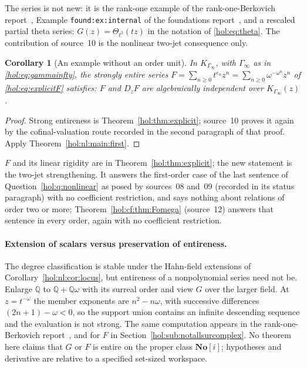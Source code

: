 \documentclass[11pt]{article}
\numberwithin{equation}{section}
\newtheorem{corollary}[theorem]{Corollary}
\theoremstyle{definition}
\theoremstyle{remark}
\newcommand{\Q}{\mathbb Q}
\newcommand{\No}{\mathbf{No}}
\begin{document}
The series is not new: it is the rank-one example of the
rank-one-Berkovich report~\cite{reporankone}, Example
\texttt{found:ex:internal} of the foundations report~\cite{repofoundations},
and a rescaled partial theta series: $G(z)=\Theta_{t^2}(tz)$ in the notation
of \eqref{hol:eq:theta}. The contribution of source~10 is the nonlinear two-jet
consequence only.

\begin{corollary}[An example without an order unit]
\label{hol:nl:cor:infiniterank}
In $K_{\Gamma_\infty}$, with $\Gamma_\infty$ as in \eqref{hol:eq:gammainfty},
the strongly entire series $F=\sum_{n\ge0}t^{e_n}z^n=\sum_{n\ge0}\omega^{-\omega^n}z^n$
of \eqref{hol:eq:explicitF} satisfies: $F$ and $D_zF$ are algebraically
independent over $K_{\Gamma_\infty}(z)$.
\end{corollary}

\begin{proof}
Strong entireness is Theorem~\ref{hol:thm:explicit}; source~10 proves it
again by the cofinal-valuation route recorded in the second paragraph of that
proof. Apply Theorem~\ref{hol:nl:main:first}.
\end{proof}

$F$ and its linear rigidity are in Theorem~\ref{hol:thm:explicit}; the new
statement is the two-jet strengthening. It answers the first-order case of
the last sentence of Question~\ref{hol:q:nonlinear} as posed by sources~08
and~09 (recorded in its status paragraph) with no coefficient
restriction, and says nothing about relations of order two or more;
Theorem~\ref{hol:cf:thm:Fomega} (source~12) answers that sentence in every
order, again with no coefficient restriction.

\paragraph{Extension of scalars versus preservation of entireness.}
The degree classification is stable under the Hahn-field extensions of
Corollary~\ref{hol:nl:cor:locus}, but entireness of a nonpolynomial series
need not be. Enlarge $\Q$ to $\Q+\Q\omega$ with its surreal order and view $G$
over the larger field. At $z=t^{-\omega}$ the member exponents are
$n^2-n\omega$, with successive differences $(2n+1)-\omega<0$, so the support
union contains an infinite descending sequence and the evaluation is not
strong. The same computation appears in the rank-one-Berkovich
report~\cite{reporankone}, and for $F$ in
Section~\ref{hol:sub:notallsurcomplex}. No theorem here claims that $G$ or $F$ is
entire on the proper class $\No[i]$; hypotheses and derivative are relative to
a specified set-sized workspace.
\end{document}
